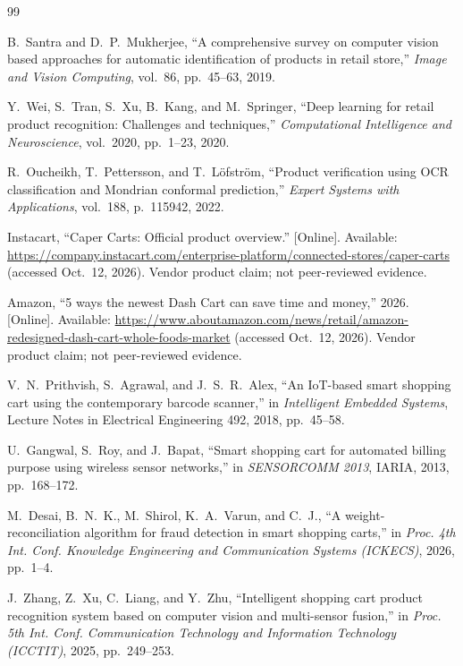 \documentclass[conference]{IEEEtran}
\begin{document}
\begin{thebibliography}{99}
\footnotesize

 B.~Santra and D.~P.~Mukherjee, ``A comprehensive survey on computer vision based
approaches for automatic identification of products in retail store,'' \emph{Image and Vision
Computing}, vol.~86, pp.~45--63, 2019.

 Y.~Wei, S.~Tran, S.~Xu, B.~Kang, and M.~Springer, ``Deep learning for retail product
recognition: Challenges and techniques,'' \emph{Computational Intelligence and Neuroscience},
vol.~2020, pp.~1--23, 2020.

 R.~Oucheikh, T.~Pettersson, and T.~L\"ofstr\"om, ``Product verification using OCR
classification and Mondrian conformal prediction,'' \emph{Expert Systems with Applications}, vol.~188,
p.~115942, 2022.

 Instacart, ``Caper Carts: Official product overview.'' [Online]. Available:
\url{https://company.instacart.com/enterprise-platform/connected-stores/caper-carts} (accessed
Oct.~12, 2026). Vendor product claim; not peer-reviewed evidence.

 Amazon, ``5 ways the newest Dash Cart can save time and money,'' 2026. [Online].
Available: \url{https://www.aboutamazon.com/news/retail/amazon-redesigned-dash-cart-whole-foods-market}
(accessed Oct.~12, 2026). Vendor product claim; not peer-reviewed evidence.

 V.~N.~Prithvish, S.~Agrawal, and J.~S.~R.~Alex, ``An IoT-based smart shopping cart using
the contemporary barcode scanner,'' in \emph{Intelligent Embedded Systems}, Lecture Notes in
Electrical Engineering 492, 2018, pp.~45--58.

 U.~Gangwal, S.~Roy, and J.~Bapat, ``Smart shopping cart for automated billing purpose
using wireless sensor networks,'' in \emph{SENSORCOMM 2013}, IARIA, 2013, pp.~168--172.

 M.~Desai, B.~N.~K., M.~Shirol, K.~A.~Varun, and C.~J., ``A weight-reconciliation
algorithm for fraud detection in smart shopping carts,'' in \emph{Proc. 4th Int. Conf. Knowledge
Engineering and Communication Systems (ICKECS)}, 2026, pp.~1--4.

 J.~Zhang, Z.~Xu, C.~Liang, and Y.~Zhu, ``Intelligent shopping cart product recognition
system based on computer vision and multi-sensor fusion,'' in \emph{Proc. 5th Int. Conf. Communication
Technology and Information Technology (ICCTIT)}, 2025, pp.~249--253.


\end{thebibliography}
\end{document}
